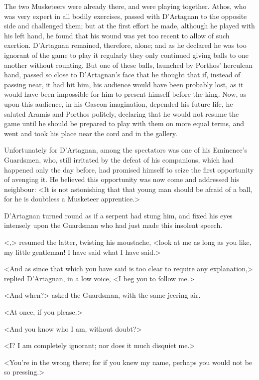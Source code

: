 The two Musketeers were already there, and were playing together. Athos, who was very expert in all bodily exercises, passed with D'Artagnan to the opposite side and challenged them; but at the first effort he made, although he played with his left hand, he found that his wound was yet too recent to allow of such exertion. D'Artagnan remained, therefore, alone; and as he declared he was too ignorant of the game to play it regularly they only continued giving balls to one another without counting. But one of these balls, launched by Porthos' herculean hand, passed so close to D'Artagnan's face that he thought that if, instead of passing near, it had hit him, his audience would have been probably lost, as it would have been impossible for him to present himself before the king. Now, as upon this audience, in his Gascon imagination, depended his future life, he saluted Aramis and Porthos politely, declaring that he would not resume the game until he should be prepared to play with them on more equal terms, and went and took his place near the cord and in the gallery. 

Unfortunately for D'Artagnan, among the spectators was one of his Eminence's Guardsmen, who, still irritated by the defeat of his companions, which had happened only the day before, had promised himself to seize the first opportunity of avenging it. He believed this opportunity was now come and addressed his neighbour: <It is not astonishing that that young man should be afraid of a ball, for he is doubtless a Musketeer apprentice.> 

D'Artagnan turned round as if a serpent had stung him, and fixed his eyes intensely upon the Guardsman who had just made this insolent speech. 

<,> resumed the latter, twisting his moustache, <look at me as long as you like, my little gentleman! I have said what I have said.> 

<And as since that which you have said is too clear to require any explanation,> replied D'Artagnan, in a low voice, <I beg you to follow me.> 

<And when?> asked the Guardsman, with the same jeering air. 

<At once, if you please.> 

<And you know who I am, without doubt?> 

<I? I am completely ignorant; nor does it much disquiet me.> 

<You're in the wrong there; for if you knew my name, perhaps you would not be so pressing.> 


